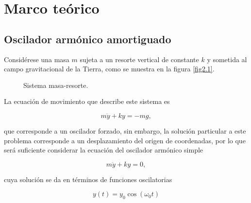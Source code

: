 \documentclass[final,5p,times,twocolumn, nopreprintline]{elsarticle}
\numberwithin{equation}{section}
\begin{document}
\section{Marco teórico}

\subsection{Oscilador armónico amortiguado}

Considérese una masa $m$ sujeta a un resorte vertical de constante $k$ y sometida al campo gravitacional de la Tierra, como se muestra en la figura \ref{fig2.1}.

\begin{figure}
\begin{center}
\caption{Sistema masa-resorte.}
\end{center}
\end{figure}\label{fig2.1}

La ecuación de movimiento que describe este sistema es

\begin{equation}
m\ddot{y}+ky=-mg,
\end{equation} \label{eq2.1}

que corresponde a un oscilador forzado, sin embargo, la solución particular a este problema corresponde a un desplazamiento del origen de coordenadas, por lo que será suficiente considerar la ecuación del oscilador armónico simple

\begin{equation}
m\ddot{y}+ky=0,
\end{equation} \label{eq2.2}

cuya solución se da en términos de funciones oscilatorias

\begin{equation}
y(t)=y_0\cos(\omega_0 t)
\end{equation} \label{eq2.3}
\end{document}
